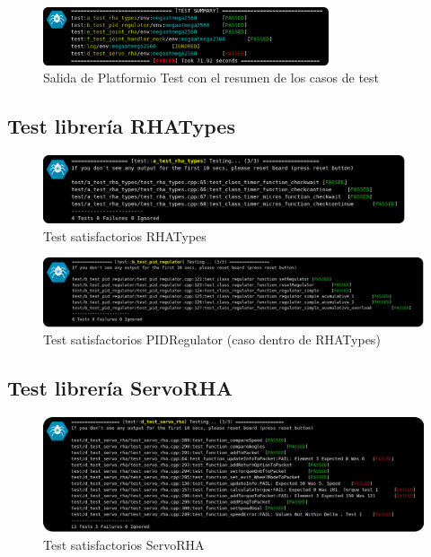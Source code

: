     \begin{figure}[H]
    	\centering
    	\includegraphics[width=0.75\textwidth]{figuras/Imagenes_SW/test/SWTest_6.jpg}
    	\caption{Salida de Platformio Test con el resumen de los casos de test}
    	\label{fig:SW:test:sum_output}
    \end{figure}

	\subsection{Test librería RHATypes}

		\begin{figure}[H]
			\centering
			\includegraphics[width=0.95\textwidth]{figuras/Imagenes_SW/test/SWTest_2.jpg}
			\caption{Test satisfactorios RHATypes}
			\label{fig:SW:test:rha_types_ok}
		\end{figure}
		\begin{figure}[H]
			\centering
			\includegraphics[width=1\textwidth]{figuras/Imagenes_SW/test/SWTest_9.jpg}
			\caption{Test satisfactorios PIDRegulator (caso dentro de RHATypes)}
			\label{fig:SW:test:pid_regulator_ok}
		\end{figure}
	\subsection{Test librería ServoRHA}
		\begin{figure}[H]
			\centering
			\includegraphics[width=1\textwidth]{figuras/Imagenes_SW/test/SWTest_4.jpg}
			\caption{Test satisfactorios ServoRHA}
			\label{fig:SW:test:servo_rha_ok}
		\end{figure}
